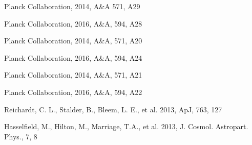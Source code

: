 \begin{thebibliography}{99}
Planck Collaboration, 2014, A\&A 571, A29

Planck Collaboration, 2016, A\&A, 594, A28

Planck Collaboration, 2014, A\&A, 571, A20

Planck Collaboration, 2016, A\&A, 594, A24

Planck Collaboration, 2014, A\&A, 571, A21

Planck Collaboration, 2016, A\&A, 594, A22

Reichardt, C. L., Stalder, B., Bleem, L. E., et al. 2013, ApJ, 763, 127

Hasselfield, M., Hilton, M., Marriage, T.A., et al. 2013, J. Cosmol. Astropart. Phys., 7, 8

\end{thebibliography}
